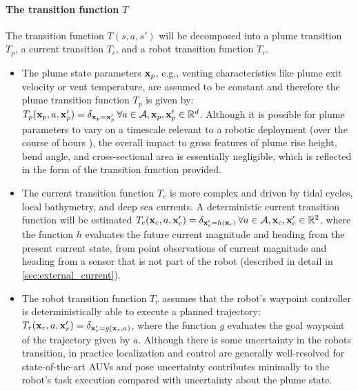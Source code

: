 \paragraph{The transition function $T$} The transition function $T(s, a, s')$ will be decomposed into a plume transition $T_p$, a current transition $T_c$, and a robot transition function $T_r$.
\begin{itemize}
	\item The plume state parameters $\mathbf{x}_p$, e.g., venting characteristics like plume exit velocity or vent temperature, are assumed to be constant and therefore the plume transition function $T_p$ is given by: $T_p(\mathbf{x}_p, a, \mathbf{x}_p') = \delta_{\mathbf{x}_p = \mathbf{x}_p'} \, \forall a \in \mathcal{A}, \mathbf{x}_p, \mathbf{x}_p' \in \mathbb{R}^d$. Although it is possible for plume parameters to vary on a timescale relevant to a robotic deployment (over the course of hours \autocite{chevaldonne1991time}), the overall impact to gross features of plume rise height, bend angle, and cross-sectional area is essentially negligible, which is reflected in the form of the transition function provided.
	\item The current transition function $T_c$ is more complex and driven by tidal cycles, local bathymetry, and deep sea currents. A deterministic current transition function will be estimated $T_c(\mathbf{x}_c, a, \mathbf{x}_c') = \delta_{\mathbf{x}_c' = h(\mathbf{x}_c)} \, \forall a \in \mathcal{A}, \mathbf{x}_c, \mathbf{x}_c' \in \mathbb{R}^2$, where the function $h$ evaluates the future current magnitude and heading from the present current state, from point observations of current magnitude and heading from a sensor that is not part of the robot (described in detail in \cref{sec:external_current}). 
	\item The robot transition function $T_r$ assumes that the robot's waypoint controller is deterministically able to execute a planned trajectory: $T_r(\mathbf{x}_r, a, \mathbf{x}_r') = \delta_{\mathbf{x}_r' = g(\mathbf{x}_r, a)}$, where the function $g$ evaluates the goal waypoint of the trajectory given by $a$. Although there is some uncertainty in the robots transition, in practice localization and control are generally well-resolved for state-of-the-art AUVs and pose uncertainty contributes minimally to the robot's task execution compared with uncertainty about the plume state.
\end{itemize}


